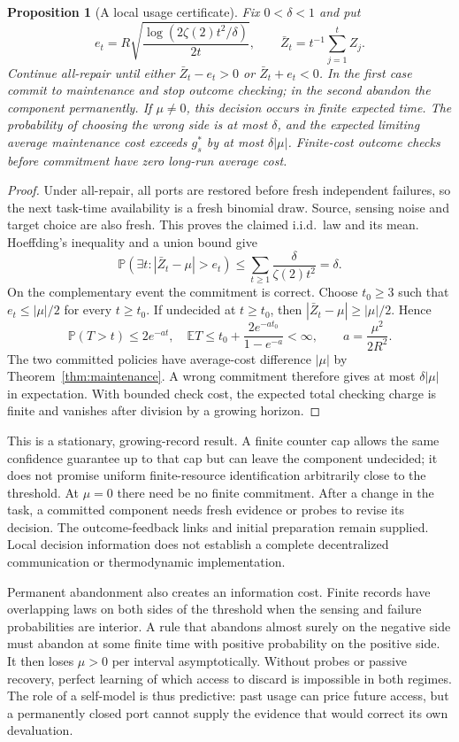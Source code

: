 \documentclass[11pt]{article}
\newtheorem{proposition}[theorem]{Proposition}
\theoremstyle{definition}
\theoremstyle{remark}
\newcommand{\E}{\mathbb E}
\newcommand{\Prb}{\mathbb P}
\begin{document}
\begin{proposition}[A local usage certificate]
\label{prop:local_usage}
Fix $0<\delta<1$ and put
\[
 e_t=R\sqrt{\frac{\log(2\zeta(2)t^2/\delta)}{2t}},\qquad
 \bar Z_t=t^{-1}\sum_{j=1}^t Z_j.
\]
Continue all-repair until either $\bar Z_t-e_t>0$ or
$\bar Z_t+e_t<0$. In the first case commit to maintenance and stop
outcome checking; in the second abandon the component permanently.
If $\mu\ne0$, this decision occurs in finite expected time.
The probability of choosing the wrong side is at most $\delta$, and
the expected limiting average maintenance cost exceeds $g_s^*$ by
at most $\delta|\mu|$. Finite-cost outcome checks before commitment
have zero long-run average cost.
\end{proposition}
\begin{proof}
Under all-repair, all ports are restored before fresh independent
failures, so the next task-time availability is a fresh binomial draw.
Source, sensing noise and target choice are also fresh. This proves
the claimed i.i.d.\ law and its mean. Hoeffding's inequality and a union
bound give
\[
 \Prb(\exists t:|\bar Z_t-\mu|>e_t)
 \le\sum_{t\ge1}\frac{\delta}{\zeta(2)t^2}=\delta.
\]
On the complementary event the commitment is correct.
Choose $t_0\ge3$ such that $e_t\le|\mu|/2$ for every $t\ge t_0$.
If undecided at $t\ge t_0$, then
$|\bar Z_t-\mu|\ge|\mu|/2$. Hence
\[
 \Prb(T>t)\le2e^{-at},\quad
 \E T\le t_0+\frac{2e^{-at_0}}{1-e^{-a}}<\infty,\qquad
 a=\frac{\mu^2}{2R^2}.
\]
The two committed policies have average-cost difference $|\mu|$
by Theorem~\ref{thm:maintenance}. A wrong commitment therefore gives
at most $\delta|\mu|$ in expectation. With bounded check cost,
the expected total checking charge is finite and vanishes after
division by a growing horizon.
\end{proof}

This is a stationary, growing-record result. A finite counter cap
allows the same confidence guarantee up to that cap but can leave the
component undecided; it does not promise uniform finite-resource
identification arbitrarily close to the threshold. At $\mu=0$ there
need be no finite commitment. After a change in the task, a committed
component needs fresh evidence or probes to revise its decision.
The outcome-feedback links and initial preparation remain supplied.
Local decision information does not establish a complete decentralized
communication or thermodynamic implementation.

Permanent abandonment also creates an information cost. Finite records
have overlapping laws on both sides of the threshold when the sensing
and failure probabilities are interior. A rule that abandons almost
surely on the negative side must abandon at some finite time with
positive probability on the positive side. It then loses $\mu>0$ per
interval asymptotically. Without probes or passive recovery, perfect
learning of which access to discard is impossible in both regimes.
The role of a self-model is thus predictive: past usage can price
future access, but a permanently closed port cannot supply the evidence
that would correct its own devaluation.
\end{document}
